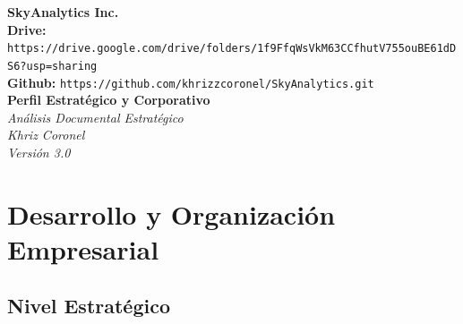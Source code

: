 ﻿\documentclass[11pt, letterpaper]{article}
\begin{document}
\begin{titlepage}

    \centering

    \vspace*{1.5cm}



    {\Huge \textbf{SkyAnalytics Inc.}}\\[1cm]

    {\footnotesize\textbf{Drive:} \texttt{https://drive.google.com/drive/folders/1f9FfqWsVkM63CCfhutV755ouBE61dDS6?usp=sharing}}\\[0.2cm]

    {\footnotesize \textbf{Github:} \texttt{https://github.com/khrizzcoronel/SkyAnalytics.git}}\\[0.8cm]

    {\Large \textbf{Perfil Estratégico y Corporativo}}\\[0.3cm]



    {\normalsize \textit{Análisis Documental Estratégico}}\\[0.3cm]

    {\normalsize \textit{Khriz Coronel}}\\[0.3cm]

    {\normalsize \textit{Versión 3.0}}\\[0.3cm]



    



\end{titlepage}



\tableofcontents

\newpage








\section{Desarrollo y Organización Empresarial}



\subsection{Nivel Estratégico}
\end{document}
